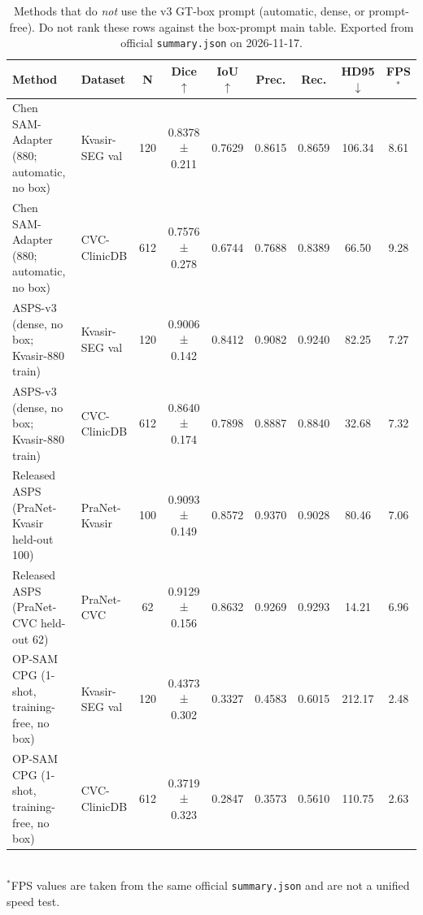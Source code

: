\begin{table}[ht]
\centering
\caption{Methods that do \emph{not} use the v3 GT-box prompt (automatic, dense, or prompt-free). Do not rank these rows against the box-prompt main table. Exported from official \texttt{summary.json} on 2026-11-17.}
\label{tab:appendix-prompt-free}
\begin{tabular}{llccccccc}
\toprule
Method & Dataset & N & Dice $\uparrow$ & IoU $\uparrow$ & Prec. & Rec. & HD95 $\downarrow$ & FPS$^*$ \\
\midrule
Chen SAM-Adapter (880; automatic, no box) & Kvasir-SEG val & 120 & 0.8378 ± 0.211 & 0.7629 & 0.8615 & 0.8659 & 106.34 & 8.61 \\
Chen SAM-Adapter (880; automatic, no box) & CVC-ClinicDB & 612 & 0.7576 ± 0.278 & 0.6744 & 0.7688 & 0.8389 & 66.50 & 9.28 \\
ASPS-v3 (dense, no box; Kvasir-880 train) & Kvasir-SEG val & 120 & 0.9006 ± 0.142 & 0.8412 & 0.9082 & 0.9240 & 82.25 & 7.27 \\
ASPS-v3 (dense, no box; Kvasir-880 train) & CVC-ClinicDB & 612 & 0.8640 ± 0.174 & 0.7898 & 0.8887 & 0.8840 & 32.68 & 7.32 \\
Released ASPS (PraNet-Kvasir held-out 100) & PraNet-Kvasir & 100 & 0.9093 ± 0.149 & 0.8572 & 0.9370 & 0.9028 & 80.46 & 7.06 \\
Released ASPS (PraNet-CVC held-out 62) & PraNet-CVC & 62 & 0.9129 ± 0.156 & 0.8632 & 0.9269 & 0.9293 & 14.21 & 6.96 \\
OP-SAM CPG (1-shot, training-free, no box) & Kvasir-SEG val & 120 & 0.4373 ± 0.302 & 0.3327 & 0.4583 & 0.6015 & 212.17 & 2.48 \\
OP-SAM CPG (1-shot, training-free, no box) & CVC-ClinicDB & 612 & 0.3719 ± 0.323 & 0.2847 & 0.3573 & 0.5610 & 110.75 & 2.63 \\
\bottomrule
\end{tabular}
\\[0.4em]{\small $^*$FPS values are taken from the same official \texttt{summary.json} and are not a unified speed test.}
\end{table}

